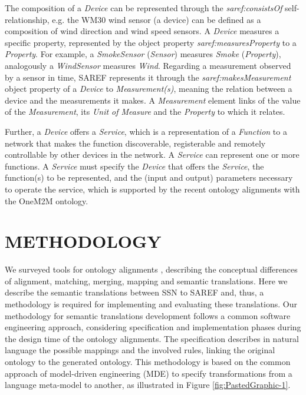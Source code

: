 \documentclass{sig-alternate-05-2015}
\begin{document}
The composition of a \textit{Device} can be represented through the \textit{saref:\-consistsOf} self-relationship, e.g. the WM30 wind sensor (a device) can be defined as a composition of wind direction and wind speed sensors. A \textit{Device} measures a specific property, represented by the object property \textit{saref:\-measuresProperty} to a \textit{Property}. For example, a \textit{SmokeSensor} (\textit{Sensor}) measures \textit{Smoke} (\textit{Property}), analogously a \textit{WindSensor} measures \textit{Wind}. Regarding a measurement observed by a sensor in time, SAREF represents it through the \textit{saref:\-makesMeasurement} object property of a \textit{Device} to \textit{Measurement(s)}, meaning the relation between a device and the measurements it makes. A \textit{Measurement} element links of the value of the \textit{Measurement}, its \textit{Unit of Measure} and the \textit{Property} to which it relates. 

Further, a \textit{Device} offers a \textit{Service}, which is a representation of a \textit{Function} to a network that makes the function discoverable, registerable and remotely controllable by other devices in the network. A \textit{Service} can represent one or more functions. A \textit{Service} must specify the \textit{Device} that offers the \textit{Service}, the function(s) to be represented, and the (input and output) parameters necessary to operate the service, which is supported by the recent ontology alignments with the OneM2M ontology.


\section{METHODOLOGY}
We surveyed tools for ontology alignments \cite{Ganzha2015}, describing the conceptual differences of alignment, matching, merging, mapping and semantic translations. Here we describe the semantic translations between SSN to SAREF and, thus, a methodology is required for implementing and evaluating these translations. Our methodology for semantic translations development follows a common software engineering approach, considering specification and implementation phases during the design time of the ontology alignments. The specification describes in natural language the possible mappings and the involved rules, linking the original ontology to the generated ontology. This methodology is based on the common approach of model-driven engineering (MDE) \cite{Brambilla2012} to specify transformations from a language meta-model to another, as illustrated in Figure \ref{fig:PastedGraphic-1}.
\end{document}
